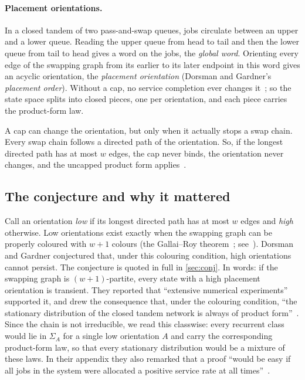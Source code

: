 \documentclass[11pt,a4paper]{article}
\theoremstyle{plain}
\theoremstyle{plain}
\newcommand{\Sg}{\Sigma}
\begin{document}
\paragraph{Placement orientations.} In a closed tandem of two pass-and-swap queues, jobs circulate between an upper and a lower queue. Reading the upper queue from head to tail and then the lower queue from tail to head gives a word on the jobs, the \emph{global word}. Orienting every edge of the swapping graph from its earlier to its later endpoint in this word gives an acyclic orientation, the \emph{placement orientation} (Dorsman and Gardner's \emph{placement order}). Without a cap, no service completion ever changes it~\cite{CD2021}; so the state space splits into closed pieces, one per orientation, and each piece carries the product-form law.

A cap can change the orientation, but only when it actually stops a swap chain. Every swap chain follows a directed path of the orientation. So, if the longest directed path has at most $w$ edges, the cap never binds, the orientation never changes, and the uncapped product form applies~\cite[Theorem~7]{DG2024}.

\subsection{The conjecture and why it mattered}

Call an orientation \emph{low} if its longest directed path has at most $w$ edges and \emph{high} otherwise. Low orientations exist exactly when the swapping graph can be properly coloured with $w+1$ colours (the Gallai--Roy theorem~\cite{Roy1967}; see~\cite[Lemma~3]{DG2024}). Dorsman and Gardner conjectured that, under this colouring condition, high orientations cannot persist. The conjecture is quoted in full in \cref{sec:conj}. In words: if the swapping graph is $(w+1)$-partite, every state with a high placement orientation is transient. They reported that ``extensive numerical experiments'' supported it, and drew the consequence that, under the colouring condition, ``the stationary distribution of the closed tandem network is always of product form''~\cite[Section~5.2.2]{DG2024}. Since the chain is not irreducible, we read this classwise: every recurrent class would lie in $\Sg_A$ for a single low orientation $A$ and carry the corresponding product-form law, so that every stationary distribution would be a mixture of these laws. In their appendix they also remarked that a proof ``would be easy if all jobs in the system were allocated a positive service rate at all times''~\cite[Appendix~C.2]{DG2024}.
\end{document}

